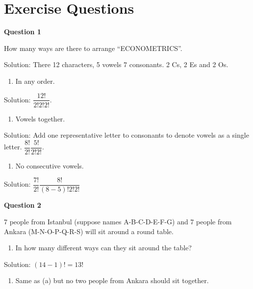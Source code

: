 \documentclass[]{book}
\providecommand{\tightlist}{%
  \setlength{\itemsep}{0pt}\setlength{\parskip}{0pt}}
\theoremstyle{definition}
\theoremstyle{definition}
\theoremstyle{definition}
\theoremstyle{remark}
\begin{document}
\hypertarget{exercise-questions}{%
\chapter{Exercise Questions}\label{exercise-questions}}

\textbf{Question 1}

How many ways are there to arrange ``ECONOMETRICS''.

Solution: There 12 characters, 5 vowels 7 consonants. 2 Cs, 2 Es and 2
Os.

\begin{enumerate}
\def\labelenumi{\alph{enumi})}
\tightlist
\item
  In any order.
\end{enumerate}

Solution: \(\dfrac{12!}{2!2!2!}\).

\begin{enumerate}
\def\labelenumi{\alph{enumi})}
\setcounter{enumi}{1}
\tightlist
\item
  Vowels together.
\end{enumerate}

Solution: Add one representative letter to consonants to denote vowels
as a single letter. \(\dfrac{8!}{2!}\dfrac{5!}{2!2!}\).

\begin{enumerate}
\def\labelenumi{\alph{enumi})}
\setcounter{enumi}{2}
\tightlist
\item
  No consecutive vowels.
\end{enumerate}

Solution: \(\dfrac{7!}{2!}\dfrac{8!}{(8-5)!2!2!}\)

\textbf{Question 2}

7 people from Istanbul (suppose names A-B-C-D-E-F-G) and 7 people from
Ankara (M-N-O-P-Q-R-S) will sit around a round table.

\begin{enumerate}
\def\labelenumi{\alph{enumi})}
\tightlist
\item
  In how many different ways can they sit around the table?
\end{enumerate}

Solution: \((14-1)! = 13!\)

\begin{enumerate}
\def\labelenumi{\alph{enumi})}
\setcounter{enumi}{1}
\tightlist
\item
  Same as (a) but no two people from Ankara should sit together.
\end{enumerate}
\end{document}

